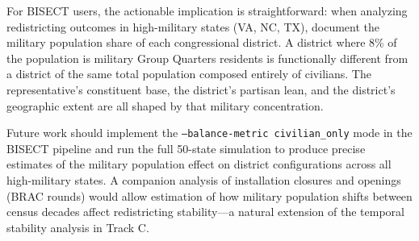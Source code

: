 For BISECT users, the actionable implication is straightforward: when analyzing redistricting outcomes in high-military states (VA, NC, TX), document the military population share of each congressional district. A district where 8\% of the population is military Group Quarters residents is functionally different from a district of the same total population composed entirely of civilians. The representative's constituent base, the district's partisan lean, and the district's geographic extent are all shaped by that military concentration.

Future work should implement the \texttt{--balance-metric civilian\_only} mode in the BISECT pipeline and run the full 50-state simulation to produce precise estimates of the military population effect on district configurations across all high-military states. A companion analysis of installation closures and openings (BRAC rounds) would allow estimation of how military population shifts between census decades affect redistricting stability---a natural extension of the temporal stability analysis in Track C.
